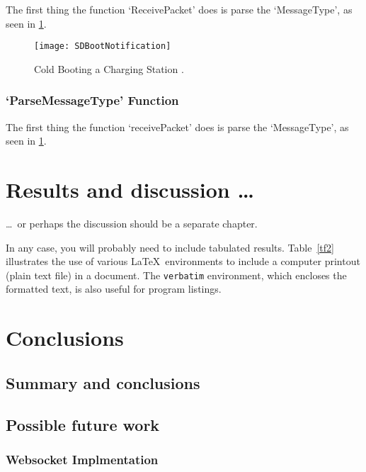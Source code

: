 \documentclass[12pt,openany,a4paper]{book}
\newcommand{\tab}[1]  {Table~\ref{#1}}		%
\begin{document}
The first thing the function `ReceivePacket' does is parse the `MessageType', as seen in \ref{fig:SDBootNotification}. 

	\begin{center}
		\begin{figure}[H]
			\texttt{[image: SDBootNotification]}
			\caption{Cold Booting a Charging Station \cite{ocpp2b}.}
			\label{fig:SDBootNotification}
		\end{figure}
	\end{center}

\subsection{`ParseMessageType' Function}

The first thing the function `receivePacket' does is parse the `MessageType', as seen in \ref{fig:SDBootNotification}. 



\chapter{Results and discussion \ldots}

\ldots\ or perhaps the discussion should be a separate chapter.

In any case, you will probably need to include tabulated results.
\tab{tf2} illustrates the use of various \LaTeX\ environments to
include a computer printout (plain text file) in a document.  The
\texttt{verbatim} environment, which encloses the formatted text, is
also useful for program listings.

\chapter{Conclusions}

\section{Summary and conclusions}

\section{Possible future work}
\subsection{Websocket Implmentation}


\appendix
\end{document}
